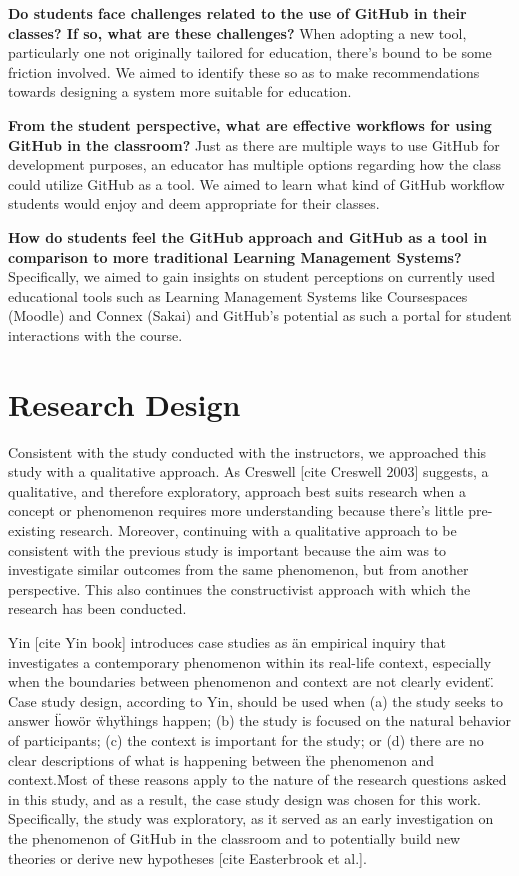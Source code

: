 \bigskip
\textbf{Do students face challenges related to the use of GitHub in their classes? If so, what are these challenges?} When adopting a new tool, particularly one not originally tailored for education, there's bound to be some friction involved. We aimed to identify these so as to make recommendations towards designing a system more suitable for education.

\bigskip
\textbf{From the student perspective, what are effective workflows for using GitHub in the classroom?} Just as there are multiple ways to use GitHub for development purposes, an educator has multiple options regarding how the class could utilize GitHub as a tool. We aimed to learn what kind of GitHub workflow students would enjoy and deem appropriate for their classes.

\bigskip
\textbf{How do students feel the GitHub approach and GitHub as a tool in comparison to more traditional Learning Management Systems?} Specifically, we aimed to gain insights on student perceptions on currently used educational tools such as Learning Management Systems like Coursespaces (Moodle) and Connex (Sakai) and GitHub's potential as such a portal for student interactions with the course.

\section{Research Design}
Consistent with the study conducted with the instructors, we approached this study with a qualitative approach. As Creswell [cite Creswell 2003] suggests, a qualitative, and therefore exploratory, approach best suits research when a concept or phenomenon requires more understanding because there's little pre-existing research. Moreover, continuing with a qualitative approach to be consistent with the previous study is important because the aim was to investigate similar outcomes from the same phenomenon, but from another perspective. This also continues the constructivist approach with which the research has been conducted.

Yin [cite Yin book] introduces case studies as \"an empirical inquiry that investigates a contemporary phenomenon within its real-life context, especially when the boundaries between phenomenon and context are not clearly evident\". Case study design, according to Yin, should be used when (a) the study seeks to answer \"how\" or \"why\" things happen; (b) the study is focused on the natural behavior of participants; (c) the context is important for the study; or (d) there are no clear descriptions of what is happening between \"the phenomenon and context.\" Most of these reasons apply to the nature of the research questions asked in this study, and as a result, the case study design was chosen for this work. Specifically, the study was exploratory, as it served as an early investigation on the phenomenon of GitHub in the classroom and to potentially build new theories or derive new hypotheses [cite Easterbrook et al.].

